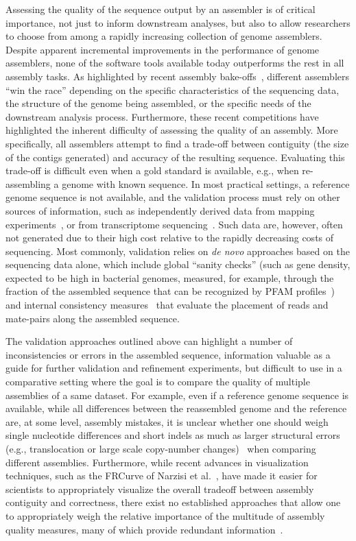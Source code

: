 Assessing the quality of the sequence output by an assembler is
of critical importance, not just to inform downstream analyses, but
also to allow researchers to choose from among a rapidly increasing
collection of genome assemblers. Despite apparent incremental
improvements in the performance of genome assemblers, none of the
software tools available today outperforms the rest in all assembly
tasks. As highlighted by recent assembly
bake-offs~\cite{earl2011assemblathon,salzberg2011gage}, different
assemblers ``win the race'' depending on the specific characteristics
of the sequencing data, the structure of the genome being assembled,
or the specific needs of the downstream analysis process.
Furthermore, these recent competitions have highlighted the inherent
difficulty of assessing the quality of an assembly.  More
specifically, all assemblers attempt to find a trade-off between
contiguity (the size of the contigs generated) and accuracy of the
resulting sequence.  Evaluating this trade-off is difficult even when
a gold standard is available, e.g., when re-assembling a genome with
known sequence.  In most practical settings, a reference genome
sequence is not available, and the validation process must rely on
other sources of information, such as independently derived data from
mapping experiments~\cite{zhou2007validation}, or from transcriptome
sequencing~\cite{adamidi2011novo}. Such data are, however, often not
generated due to their high cost relative to the rapidly decreasing
costs of sequencing. Most commonly, validation relies on \emph{de
  novo} approaches based on the sequencing data alone, which include
global ``sanity checks'' (such as gene density, expected to be high in
bacterial genomes, measured, for example, through the fraction of the
assembled sequence that can be recognized by PFAM
profiles~\cite{genovo2011}) and internal consistency
measures~\cite{amosvalidate2008} that evaluate the placement of reads
and mate-pairs along the assembled sequence.

The validation approaches outlined above can highlight a number of
inconsistencies or errors in the assembled sequence, information
valuable as a guide for further validation and refinement experiments,
but difficult to use in a comparative setting where the goal is to
compare the quality of multiple assemblies of a same dataset.  For
example, even if a reference genome sequence is available, while all
differences between the reassembled genome and the reference are, at
some level, assembly mistakes, it is unclear whether one should weigh
single nucleotide differences and short indels as much as larger
structural errors (e.g., translocation or large scale copy-number
changes)~\cite{earl2011assemblathon} when comparing different
assemblies.  Furthermore, while recent advances in visualization
techniques, such as the FRCurve of Narzisi et
al.~\cite{FRC2011,vezzi2012feature}, have made it easier for
scientists to appropriately visualize the overall tradeoff between
assembly contiguity and correctness, there exist no established
approaches that allow one to appropriately weigh
the relative importance of the multitude of assembly quality measures,
many of which provide redundant information~\cite{vezzi2012feature}.

